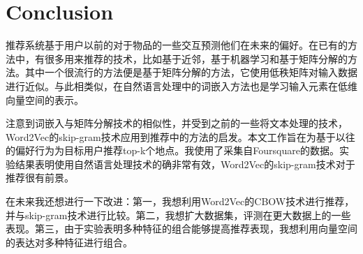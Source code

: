 \documentclass[UTF8]{ctexart}
\begin{document}
	\section{Conclusion}
	推荐系统基于用户以前的对于物品的一些交互预测他们在未来的偏好。在已有的方法中，有很多用来推荐的技术，比如基于近邻，基于机器学习和基于矩阵分解的方法。其中一个很流行的方法便是基于矩阵分解的方法，它使用低秩矩阵对输入数据进行近似。与此相类似，在自然语言处理中的词嵌入方法也是学习输入元素在低维向量空间的表示。
	
	注意到词嵌入与矩阵分解技术的相似性，并受到之前的一些将文本处理的技术， Word2Vec的skip-gram技术应用到推荐中的方法的启发。本文工作旨在为基于以往的偏好行为为目标用户推荐top-k个地点。我使用了采集自Foursquare的数据。实验结果表明使用自然语言处理技术的确非常有效，Word2Vec的skip-gram技术对于推荐很有前景。
	
	在未来我还想进行一下改进：第一，我想利用Word2Vec的CBOW技术进行推荐，并与skip-gram技术进行比较。第二，我想扩大数据集，评测在更大数据上的一些表现。第三，由于实验表明多种特征的组合能够提高推荐表现，我想利用向量空间的表达对多种特征进行组合。
	

	
	
	
	
\end{document}

